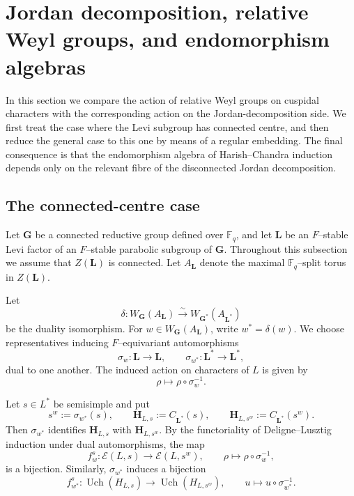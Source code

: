 \documentclass{amsart}
\theoremstyle{plain}
\numberwithin{equation}{section}
\theoremstyle{definition}
\newcommand{\fq}{\mathbb{F}_{q}}
\newcommand{\Uch}{\operatorname{Uch}}
\newcommand{\bG}{\mathbf{G}}
\newcommand{\bL}{\mathbf{L}}
\newcommand{\bH}{\mathbf{H}}
\begin{document}
\section{Jordan decomposition, relative Weyl groups, and endomorphism algebras}

In this section we compare the action of relative Weyl groups on cuspidal
characters with the corresponding action on the Jordan-decomposition side.
We first treat the case where the Levi subgroup has connected centre, and
then reduce the general case to this one by means of a regular embedding.
The final consequence is that the endomorphism algebra of Harish--Chandra
induction depends only on the relevant fibre of the disconnected Jordan
decomposition.

\subsection{The connected-centre case}

Let $\bG$ be a connected reductive group defined over $\fq$, and let
$\bL$ be an $F$--stable Levi factor of an $F$--stable parabolic subgroup of
$\bG$.  Throughout this subsection we assume that $Z(\bL)$ is connected.
Let $A_{\bL}$ denote the maximal $\fq$--split torus in $Z(\bL)$.

Let
\[
\delta:W_{\bG}(A_{\bL})\xrightarrow{\sim}W_{\bG^*}(A_{\bL^*})
\]
be the duality isomorphism.  For $w\in W_{\bG}(A_{\bL})$, write
$w^*=\delta(w)$.  We choose representatives inducing $F$--equivariant
automorphisms
\[
\sigma_w:\bL\longrightarrow\bL,
\qquad
\sigma_{w^*}:\bL^*\longrightarrow\bL^*,
\]
dual to one another.  The induced action on characters of $L$ is given by
\[
\rho\longmapsto \rho\circ\sigma_w^{-1}.
\]

Let $s\in L^*$ be semisimple and put
\[
s^w:=\sigma_{w^*}(s),\qquad
\bH_{L,s}:=C_{\bL^*}(s),\qquad
\bH_{L,s^w}:=C_{\bL^*}(s^w).
\]
Then $\sigma_{w^*}$ identifies $\bH_{L,s}$ with $\bH_{L,s^w}$.  By the
functoriality of Deligne--Lusztig induction under dual automorphisms, the map
\[
f_w^s:\mathcal E(L,s)\longrightarrow \mathcal E(L,s^w),
\qquad
\rho\longmapsto \rho\circ\sigma_w^{-1},
\]
is a bijection.  Similarly, $\sigma_{w^*}$ induces a bijection
\[
f_{w^*}^s:\Uch(H_{L,s})\longrightarrow \Uch(H_{L,s^w}),
\qquad
u\longmapsto u\circ\sigma_{w^*}^{-1}.
\]
\end{document}
